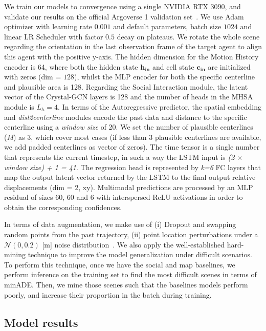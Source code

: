 We train our models to convergence using a single NVIDIA RTX 3090, and validate our results on the official Argoverse 1 validation set~\cite{chang2019argoverse}. We use Adam optimizer with learning rate $0.001$ and default parameters, batch size $1024$ and linear LR Scheduler with factor $0.5$ decay on plateaus. We rotate the whole scene regarding the orientation in the last observation frame of the target agent to align this agent with the positive y-axis. The hidden dimension for the Motion History encoder is 64, where both the hidden state $\mathbf{h_{in}}$ and cell state $\mathbf{c_{in}}$ are initialized with zeros (dim = $128$), whilst the MLP encoder for both the specific centerline and plausible area is 128. Regarding the Social Interaction module, the latent vector of the Crystal-GCN layers is 128 and the number of heads in the MHSA module is $L_h = 4$. In terms of the Autoregressive predictor, the spatial embedding and \textit{dist2centerline} modules encode the past data and distance to the specific centerline using a \textit{window size} of 20. We set the number of plausible centerlines (\textit{M}) as 3, which cover most cases (if less than 3 plausible centerlines are available, we add padded centerlines as vector of zeros). The time tensor is a single number that represents the current timestep, in such a way the LSTM input is \textit{(2 $\times$ window size) + 1 = 41}. The regression head is represented by \textit{k=6} FC layers that map the output latent vector returned by the LSTM to the final output relative displacements (dim = 2, xy). Multimodal predictions are processed by an MLP residual of sizes 60, 60 and 6 with interspersed ReLU activations in order to obtain the corresponding confidences.

In terms of data augmentation, we make use of (i) Dropout and swapping random points from the past trajectory, (ii) point location perturbations under a $\mathcal{N}(0, 0.2)$ [m] noise distribution~\cite{ye2021tpcn}. We also apply the well-established hard-mining technique to improve the model generalization under difficult scenarios. To perform this technique, once we have the social and map baselines, we perform inference on the training set to find the most difficult scenes in terms of \ac{minADE}. Then, we mine those scenes such that the baselines models perform poorly, and increase their proportion in the batch during training.

\subsection{Model results}
\label{subsec:6_model_results}

